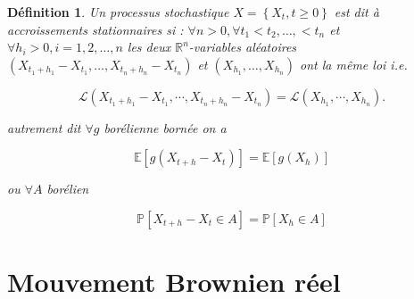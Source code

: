 \documentclass[A4paper,12pt]{report}
\newtheorem{definition}{D\'efinition}[chapter]
\newcommand{\E}{{\mathbb{E}}}
\newcommand{\pr}{{\mathbb{P}}}
\begin{document}
\begin{definition} 
Un processus stochastique $X=\left\{X_{t}, t \geq 0\right\}$ est dit à accroissements stationnaires si : $\forall n>0, \forall t_{1}<t_{2}, \ldots,<t_{n}$ et $\forall h_{i}>0, i=1,2, \ldots, n$ les deux $\mathbb{R}^{n}$-variables aléatoires $\left(X_{t_{1}+h_{1}}-X_{t_{1}}, \ldots, X_{t_{n}+h_{n}}-X_{t_{n}}\right)$ et $\left(X_{h_{1}}, \ldots, X_{h_{n}}\right)$ ont la même loi i.e.

$$
\mathcal{L}(X_{t_{1}+h_{1}}-X_{t_{1}}, \cdots, X_{t_{n}+h_{n}}-X_{t_{n}})=\mathcal{L}(X_{h_{1}}, \cdots, X_{h_{n}}) .
$$

autrement dit $\forall g$ borélienne bornée on a

$$
\E\left[g\left(X_{t+h}-X_{t}\right)\right]=\E\left[g\left(X_{h}\right)\right]
$$

ou $\forall A$ borélien

$$
\pr\left[X_{t+h}-X_{t} \in A\right]=\pr\left[X_{h} \in A\right]
$$
\end{definition} 
\section{Mouvement Brownien réel}
\end{document}
